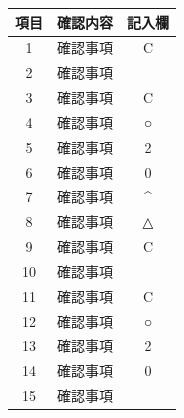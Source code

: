 \documentclass[UTF8,10pt,a4paper,fontset=fandol]{ctexart}
\newcommand{\fieldvalue}[1]{#1}
\newcommand{\handwritten}[1]{#1}
\begin{document}
\noindent
\small
\begin{tabularx}{\textwidth}{|c|X|c|}
\hline
\textbf{項目} & \textbf{確認内容} & \textbf{記入欄} \\
\hline
1 & 確認事項 & 
\fieldvalue{\handwritten{C}} \\
\hline
2 & 確認事項 & 
\fieldvalue{\handwritten{\checkmark}} \\
\hline
3 & 確認事項 & 
\fieldvalue{\handwritten{C}} \\
\hline
4 & 確認事項 & 
\fieldvalue{\handwritten{○}} \\
\hline
5 & 確認事項 & 
\fieldvalue{\handwritten{2}} \\
\hline
6 & 確認事項 & 
\fieldvalue{\handwritten{0}} \\
\hline
7 & 確認事項 & 
\fieldvalue{\handwritten{\textasciicircum}} \\
\hline
8 & 確認事項 & 
\fieldvalue{\handwritten{△}} \\
\hline
9 & 確認事項 & 
\fieldvalue{\handwritten{C}} \\
\hline
10 & 確認事項 & 
\fieldvalue{\handwritten{\checkmark}} \\
\hline
11 & 確認事項 & 
\fieldvalue{\handwritten{C}} \\
\hline
12 & 確認事項 & 
\fieldvalue{\handwritten{○}} \\
\hline
13 & 確認事項 & 
\fieldvalue{\handwritten{2}} \\
\hline
14 & 確認事項 & 
\fieldvalue{\handwritten{0}} \\
\hline
15 & 確認事項 & 

\end{tabularx}
\end{document}
